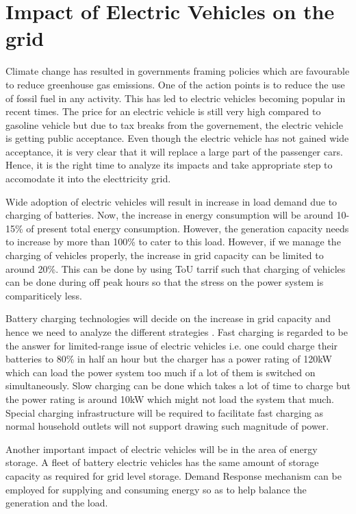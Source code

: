 \documentclass[11pt,a4paper]{article}
\begin{document}
\section{Impact of Electric Vehicles on the grid}
Climate change has resulted in governments framing policies which are favourable to reduce greenhouse gas emissions. One of the action points is to reduce the use of fossil fuel in any activity. This has led to electric vehicles becoming popular in recent times. The price for an electric vehicle is still very high compared to gasoline vehicle but due to tax breaks from the governement, the electric vehicle is getting public acceptance. Even though the electric vehicle has not gained wide acceptance, it is very clear that it will replace a large part of the passenger cars. Hence, it is the right time to analyze its impacts and take appropriate step to accomodate it into the electtricity grid.

Wide adoption of electric vehicles will result in increase in load demand due to charging of batteries. Now, the increase in energy consumption will be around 10-15\% of present total energy consumption. However, the generation capacity needs to increase by more than 100\% to cater to this load. However, if we manage the charging of vehicles properly, the increase in grid capacity can be limited to around 20\%. This can be done by using ToU tarrif such that charging of vehicles can be done during off peak hours so that the stress on the power system is compariticely less\cite{cao2012optimized}.

Battery charging technologies will decide on the increase in grid capacity and hence we need to analyze the different strategies . Fast charging is regarded to be the answer for limited-range issue of electric vehicles i.e. one could charge their batteries to 80\% in half an hour but the charger has a power rating of 120kW which can load the power system too much if a lot of them is switched on simultaneously. Slow charging can be done which takes a lot of time to charge but the power rating is around 10kW which might not load the system that much. Special charging infrastructure will be required to facilitate fast charging as normal household outlets will not support drawing such magnitude of power.

Another important impact of electric vehicles will be in the area of energy storage. A fleet of battery electric vehicles has the same amount of storage capacity as required for grid level storage. Demand Response mechanism can be employed for supplying and consuming energy so as to help balance the generation and the load.



\end{document}
